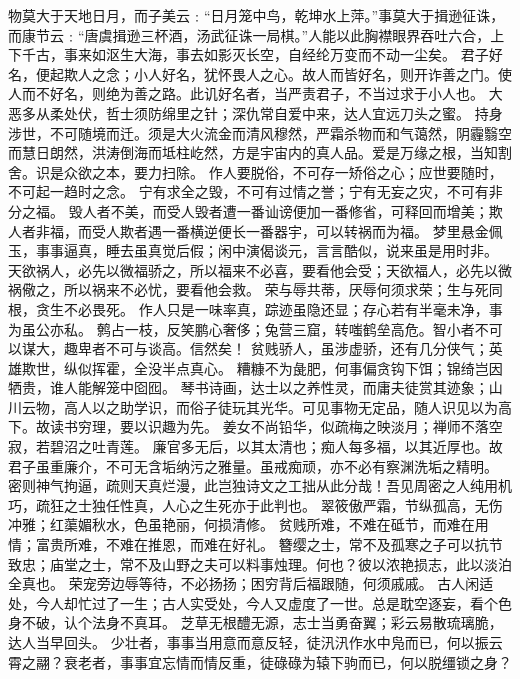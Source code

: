 \documentclass[12pt,UTF8]{ctexbook}
\begin{document}
物莫大于天地日月，而子美云﹕“日月笼中鸟，乾坤水上萍。”事莫大于揖逊征诛，而康节云﹕“唐虞揖逊三杯酒，汤武征诛一局棋。”人能以此胸襟眼界吞吐六合，上下千古，事来如沤生大海，事去如影灭长空，自经纶万变而不动一尘矣。
君子好名，便起欺人之念；小人好名，犹怀畏人之心。故人而皆好名，则开诈善之门。使人而不好名，则绝为善之路。此讥好名者，当严责君子，不当过求于小人也。
大恶多从柔处伏，哲士须防绵里之针；深仇常自爱中来，达人宜远刀头之蜜。
持身涉世，不可随境而迁。须是大火流金而清风穆然，严霜杀物而和气蔼然，阴霾翳空而慧日朗然，洪涛倒海而坻柱屹然，方是宇宙内的真人品。爱是万缘之根，当知割舍。识是众欲之本，要力扫除。
作人要脱俗，不可存一矫俗之心；应世要随时，不可起一趋时之念。
宁有求全之毁，不可有过情之誉；宁有无妄之灾，不可有非分之福。
毁人者不美，而受人毁者遭一番讪谤便加一番修省，可释回而增美；欺人者非福，而受人欺者遇一番横逆便长一番器宇，可以转祸而为福。
梦里悬金佩玉，事事逼真，睡去虽真觉后假；闲中演偈谈元，言言酷似，说来虽是用时非。
天欲祸人，必先以微福骄之，所以福来不必喜，要看他会受；天欲福人，必先以微祸儆之，所以祸来不必忧，要看他会救。
荣与辱共蒂，厌辱何须求荣；生与死同根，贪生不必畏死。
作人只是一味率真，踪迹虽隐还显；存心若有半毫未净，事为虽公亦私。
鹩占一枝，反笑鹏心奢侈；兔营三窟，转嗤鹤垒高危。智小者不可以谋大，趣卑者不可与谈高。信然矣！
贫贱骄人，虽涉虚骄，还有几分侠气；英雄欺世，纵似挥霍，全没半点真心。
糟糠不为彘肥，何事偏贪钩下饵；锦绮岂因牺贵，谁人能解笼中囵囮。
琴书诗画，达士以之养性灵，而庸夫徒赏其迹象；山川云物，高人以之助学识，而俗子徒玩其光华。可见事物无定品，随人识见以为高下。故读书穷理，要以识趣为先。
姜女不尚铅华，似疏梅之映淡月；禅师不落空寂，若碧沼之吐青莲。
廉官多无后，以其太清也；痴人每多福，以其近厚也。故君子虽重廉介，不可无含垢纳污之雅量。虽戒痴顽，亦不必有察渊洗垢之精明。
密则神气拘逼，疏则天真烂漫，此岂独诗文之工拙从此分哉！吾见周密之人纯用机巧，疏狂之士独任性真，人心之生死亦于此判也。
翠筱傲严霜，节纵孤高，无伤冲雅；红蕖媚秋水，色虽艳丽，何损清修。
贫贱所难，不难在砥节，而难在用情；富贵所难，不难在推恩，而难在好礼。
簪缨之士，常不及孤寒之子可以抗节致忠；庙堂之士，常不及山野之夫可以料事烛理。何也？彼以浓艳损志，此以淡泊全真也。
荣宠旁边辱等待，不必扬扬；困穷背后福跟随，何须戚戚。
古人闲适处，今人却忙过了一生；古人实受处，今人又虚度了一世。总是耽空逐妄，看个色身不破，认个法身不真耳。
芝草无根醴无源，志士当勇奋翼；彩云易散琉璃脆，达人当早回头。
少壮者，事事当用意而意反轻，徒汛汛作水中凫而已，何以振云霄之翮？衰老者，事事宜忘情而情反重，徒碌碌为辕下驹而已，何以脱缰锁之身？
\end{document}
